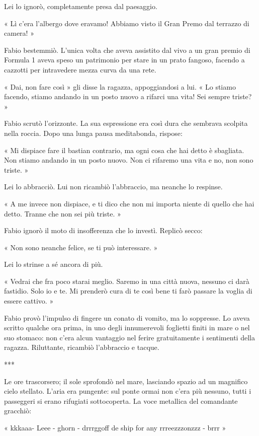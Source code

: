 Lei lo ignorò, completamente presa dal paesaggio.

« Lì c'era l'albergo dove eravamo! Abbiamo visto il Gran Premo dal terrazzo di camera! »

Fabio bestemmiò. L'unica volta che aveva assistito dal vivo a un gran premio di Formula 1 aveva speso un patrimonio per stare in un prato fangoso, facendo a cazzotti per intravedere mezza curva da una rete.

« Dai, non fare così » gli disse la ragazza, appoggiandosi a lui. « Lo stiamo facendo, stiamo andando in un posto nuovo a rifarci una vita! Sei sempre triste? »

Fabio scrutò l'orizzonte. La sua espressione era così dura che sembrava scolpita nella roccia. Dopo una lunga pausa meditabonda, rispose:

« Mi dispiace fare il bastian contrario, ma ogni cosa che hai detto è sbagliata. Non stiamo andando in un posto nuovo. Non ci rifaremo una vita e no, non sono triste. »

Lei lo abbracciò. Lui non ricambiò l'abbraccio, ma neanche lo respinse.

« A me invece non dispiace, e ti dico che non mi importa niente di quello che hai detto. Tranne che non sei più triste. »

Fabio ignorò il moto di insofferenza che lo investì. Replicò secco:

« Non sono neanche felice, se ti può interessare. »

Lei lo strinse a sé ancora di più.

« Vedrai che fra poco starai meglio. Saremo in una città nuova, nessuno ci darà fastidio. Solo io e te. Mi prenderò cura di te così bene ti farò passare la voglia di essere cattivo. »

Fabio provò l'impulso di fingere un conato di vomito, ma lo soppresse. Lo aveva scritto qualche ora prima, in uno degli innumerevoli foglietti finiti in mare o nel suo stomaco: non c'era alcun vantaggio nel ferire gratuitamente i sentimenti della ragazza. Riluttante, ricambiò l'abbraccio e tacque.

***

Le ore trascorsero; il sole sprofondò nel mare, lasciando spazio ad un magnifico cielo stellato. L'aria era pungente: sul ponte ormai non c'era più nessuno, tutti i passeggeri si erano rifugiati sottocoperta. La voce metallica del comandante gracchiò:

« kkkaaa- Leee - ghorn - drrrggoff de ship for any rrreezzzonzzz - brrr »

